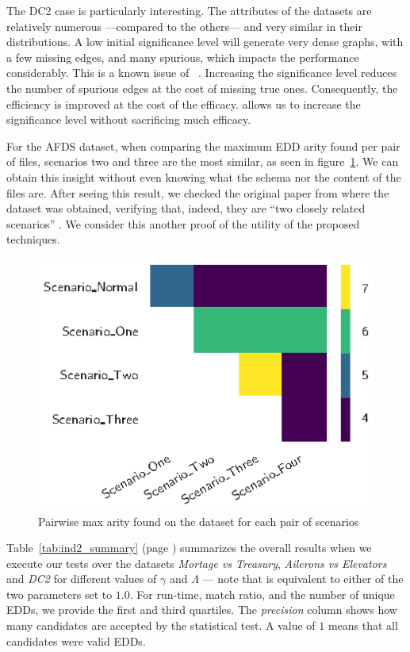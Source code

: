 The DC2 case is particularly interesting. The attributes of the datasets
are relatively numerous ---compared to the others--- and very similar in their distributions.
A low initial significance level will generate very dense graphs, with a few missing edges, and
many spurious, which impacts the performance considerably.
This is a known issue of \Find~\cite{koeller2006heuristic}.
Increasing the significance level reduces the number of spurious edges at the cost of
missing true ones. Consequently, the efficiency is improved at the cost of the efficacy.
\PresQ allows us to increase the significance
level without sacrificing much efficacy.

For the \gls{AFDS} dataset, when comparing the maximum \gls{EDD} arity found per pair of files,
scenarios two and three are the most similar, as seen in figure~\ref{fig:afds}.
We can obtain this insight without even knowing what the schema nor the content of the files are.
After seeing this result, we checked the original paper from
where the dataset was obtained, verifying that, indeed, they are
``two closely related scenarios'' \cite{Gheraibia2019}.
We consider this another proof of the utility of the proposed techniques.


\begin{figure}[ht]
    \centering
    \includegraphics[width=0.5\linewidth]{images/5_presq/afds}
    \caption{
        Pairwise max arity found on the  dataset for each pair of scenarios
    }
    \label{fig:afds}
\end{figure}

Table~\ref{tab:ind2_summary} (page \pageref{tab:ind2_summary}) summarizes
the overall results when
we execute our tests over the datasets \emph{Mortage vs Treasury},
\emph{Ailerons vs Elevators} and \emph{DC2} for different values of $\gamma$ and $\Lambda$ ---
note that \Find is equivalent to either of the two parameters set to $1.0$. For run-time,
match ratio, and the number of unique \glspl{EDD}, we provide the first and third quartiles.
The \emph{precision} column shows how many candidates are accepted by the
statistical test. A value of $1$ means that all candidates were valid \glspl{EDD}.

